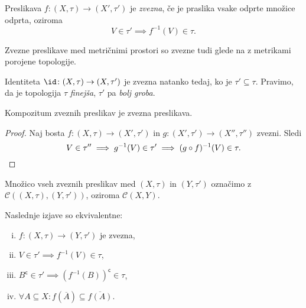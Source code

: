 
\begin{okvir}
\begin{definicija}
Preslikava $f \colon (X,\tau)\to(X',\tau')$ je
\emph{zvezna}, če je praslika vsake odprte
množice odprta, oziroma
\[
V\in\tau' \implies f^{-1}(V) \in \tau.
\]
\end{definicija}
\end{okvir}

\begin{opomba}
Zvezne preslikave med metričnimi prostori so zvezne tudi glede na z
metrikami porojene topologije.
\end{opomba}

\begin{opomba}
Identiteta $\id \colon (X,\tau) \to (X,\tau')$ je
zvezna natanko tedaj, ko je $\tau' \subseteq \tau$.
Pravimo, da je topologija $\tau$
\emph{finejša},
$\tau'$ pa
\emph{bolj groba}.
\end{opomba}

\begin{trditev}
Kompozitum zveznih preslikav je zvezna preslikava.
\end{trditev}

\begin{proof}
Naj bosta $f \colon (X,\tau) \to (X',\tau')$ in
$g \colon (X',\tau') \to (X'',\tau'')$ zvezni. Sledi
\[
V \in \tau'' \implies g^{-1}(V) \in \tau' \implies
(g \circ f)^{-1}(V) \in \tau. \qedhere
\]
\end{proof}

\begin{opomba}
Množico vseh zveznih preslikav med $(X,\tau)$ in
$(Y,\tau')$ označimo z $\mathcal{C}((X,\tau),
(Y,\tau'))$, oziroma $\mathcal{C}(X,Y)$.
\end{opomba}

\begin{izrek}
Naslednje izjave so ekvivalentne:

\begin{enumerate}[i)]
\item $f \colon (X,\tau) \to (Y,\tau')$ je zvezna,
\item $V \in \tau' \implies f^{-1}(V) \in \tau$,
\item $B^\mathsf{c} \in \tau' \implies
(f^{-1}(B))^\mathsf{c} \in \tau$,
\item $\forall A \subseteq X \colon f(\overline{A}) \subseteq
\overline{f(A)}$.
\end{enumerate}
\end{izrek}

